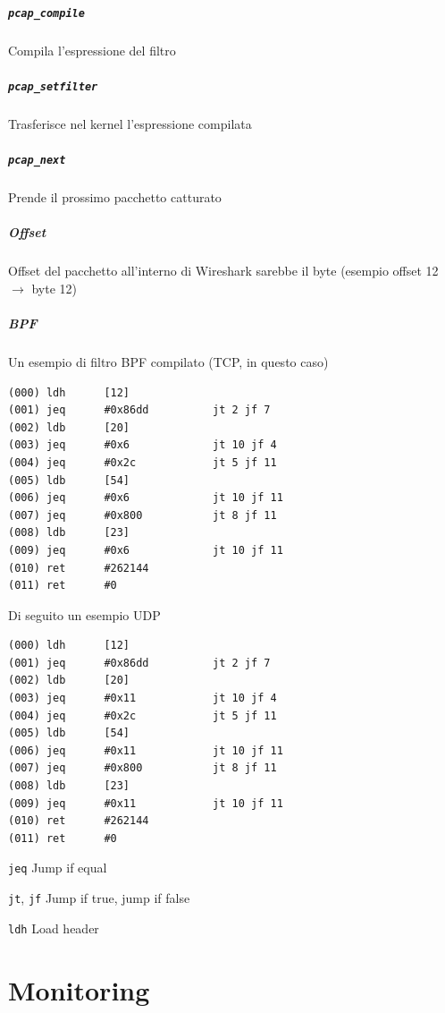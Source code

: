 \documentclass[10pt]{book}
\begin{document}
\paragraph{\texttt{pcap\_compile}} Compila l'espressione del filtro
\paragraph{\texttt{pcap\_setfilter}} Trasferisce nel kernel l'espressione compilata
\paragraph{\texttt{pcap\_next}} Prende il prossimo pacchetto catturato
\paragraph{Offset} Offset del pacchetto all'interno di Wireshark sarebbe il byte (esempio offset 12 $\rightarrow$ byte 12)
\paragraph{BPF} Un esempio di filtro BPF compilato (TCP, in questo caso) \begin{lstlisting}
(000) ldh      [12]
(001) jeq      #0x86dd          jt 2 jf 7
(002) ldb      [20]
(003) jeq      #0x6             jt 10 jf 4
(004) jeq      #0x2c            jt 5 jf 11
(005) ldb      [54]
(006) jeq      #0x6             jt 10 jf 11
(007) jeq      #0x800           jt 8 jf 11
(008) ldb      [23]
(009) jeq      #0x6             jt 10 jf 11
(010) ret      #262144
(011) ret      #0
\end{lstlisting}
Di seguito un esempio UDP \begin{lstlisting}
(000) ldh      [12]
(001) jeq      #0x86dd          jt 2 jf 7
(002) ldb      [20]
(003) jeq      #0x11            jt 10 jf 4
(004) jeq      #0x2c            jt 5 jf 11
(005) ldb      [54]
(006) jeq      #0x11            jt 10 jf 11
(007) jeq      #0x800           jt 8 jf 11
(008) ldb      [23]
(009) jeq      #0x11            jt 10 jf 11
(010) ret      #262144
(011) ret      #0
\end{lstlisting}
\begin{list}{}{}
	\item \texttt{jeq} Jump if equal
	\item \texttt{jt}, \texttt{jf} Jump if true, jump if false
	\item \texttt{ldh} Load header
\end{list}
\chapter{Monitoring}
\end{document}
